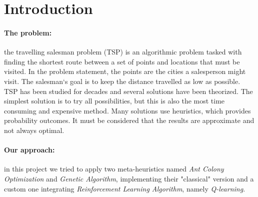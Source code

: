 \section{Introduction}
\paragraph{The problem:}
the travelling salesman problem (TSP) is an algorithmic problem tasked with finding the shortest route between a set of points and locations that must be visited. 
In the problem statement, the points are the cities a salesperson might visit. The salesman‘s goal is to keep the distance travelled as low as possible. 
TSP has been studied for decades and several solutions have been theorized. 
The simplest solution is to try all possibilities, but this is also the most time consuming and expensive method. 
Many solutions use heuristics, which provides probability outcomes. 
It must be considered that the results are approximate and not always optimal. 
\paragraph{Our approach:}
in this project we tried to apply two meta-heuristics named \textit{Ant Colony Optimization} and \textit{Genetic Algorithm}, implementing their "classical" version and a custom one integrating \textit{Reinforcement Learning Algorithm}, namely \textit{Q-learning}.

